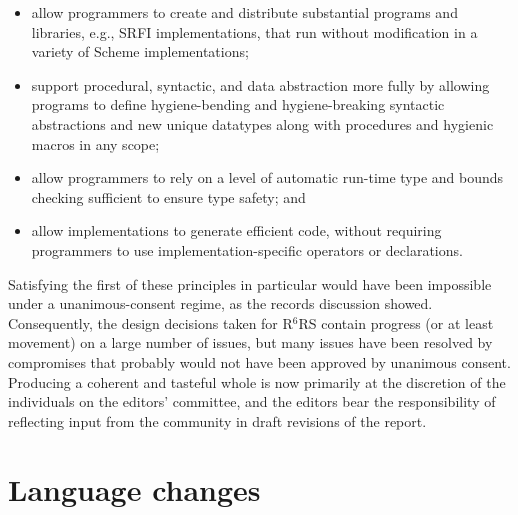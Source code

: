 \documentclass{sigplanconf}
\newcommand{\rn}[1]{R$^{#1}$RS}
\begin{document}
\begin{itemize}
\item allow programmers to create and distribute substantial programs
  and libraries, e.g., SRFI implementations, that run without
  modification in a variety of Scheme implementations;
  
\item support procedural, syntactic, and data abstraction more fully
  by allowing programs to define hygiene-bending and hygiene-breaking
  syntactic abstractions and new unique datatypes along with
  procedures and hygienic macros in any scope;
  
\item allow programmers to rely on a level of automatic run-time type
  and bounds checking sufficient to ensure type safety; and

\item allow implementations to generate efficient code, without
  requiring programmers to use implementation-specific operators or
  declarations.
\end{itemize}
%
Satisfying the first of these principles in particular would have been
impossible under a unanimous-consent regime, as the records discussion
showed.  Consequently, the design decisions taken for \rn{6} contain
progress (or at least movement) on a large number of issues, but many
issues have been resolved by compromises that probably would not have
been approved by unanimous consent.  Producing a coherent and tasteful
whole is now primarily at the discretion of the individuals on the
editors' committee, and the editors bear the responsibility of
reflecting input from the community in draft revisions of the report.

\section{Language changes}
\label{sec:changes}
\end{document}

